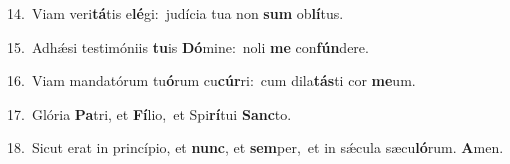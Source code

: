 {\numbfont\textcolor{\numbcolor}{14.}}~Viam veri\-\textbf{tá}\-tis e\-\textbf{lé}\-gi:~\star judícia tua non \textbf{sum} ob\-\textbf{lí}\-tus.\par
{\numbfont\textcolor{\numbcolor}{15.}}~Adhǽsi testimóniis \textbf{tu}\-is \textbf{Dó}\-mine:~\star noli \textbf{me} con\-\textbf{fún}\-dere.\par
{\numbfont\textcolor{\numbcolor}{16.}}~Viam mandatórum tu\-\textbf{ó}\-rum cu\-\textbf{cúr}\-ri:~\star cum dila\-\textbf{tás}\-ti cor \textbf{me}\-um.\par
{\numbfont\textcolor{\numbcolor}{17.}}~Glória \textbf{Pa}\-tri, et \textbf{Fí}\-lio,~\star et Spi\-\textbf{rí}\-tui \textbf{Sanc}\-to.\par
{\numbfont\textcolor{\numbcolor}{18.}}~Sicut erat in princípio, et \textbf{nunc}\-, et \textbf{sem}\-per,~\star et in sǽcula sæcu\-\textbf{ló}\-rum. \textbf{A}\-men.\par
